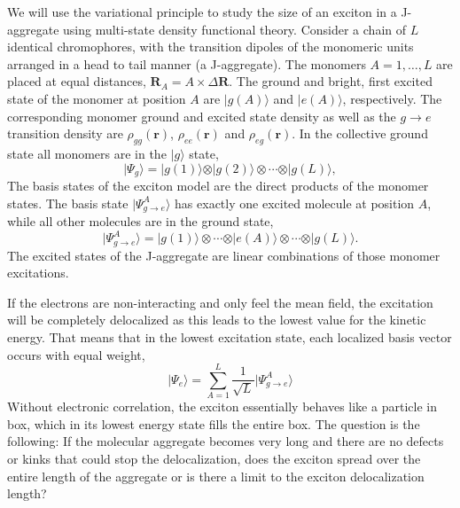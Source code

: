 \documentclass[journal=jacsat,manuscript=article]{achemso}
\renewcommand\vec[1]{\mathbf{#1}}
\begin{document}
We will use the variational principle to study the size of an exciton in a J-aggregate using multi-state density functional theory.
Consider a chain of $L$ identical chromophores, with the transition dipoles of the monomeric units arranged in a head to tail manner (a J-aggregate).
The monomers $A=1,\ldots,L$ are placed at equal distances, $\vec{R}_A = A \times \Delta \vec{R}$.
The ground and bright, first excited state of the monomer at position $A$ are $\vert g(A) \rangle$ and $\vert e(A) \rangle$, respectively.
The corresponding monomer ground and excited state density as well as the $g \to e$ transition density are $\rho_{gg}(\vec{r})$, $\rho_{ee}(\vec{r})$
and $\rho_{eg}(\vec{r})$.
In the collective ground state all monomers are in the $\vert g \rangle$ state,
\begin{equation}
 \vert \Psi_g \rangle = \vert g(1) \rangle \otimes \vert g(2) \rangle \otimes \cdots \otimes \vert g(L) \rangle,
\end{equation}
The basis states of the exciton model \cite{Kasha1965} are the direct products of the monomer states.
The basis state $\vert \Psi_{g \to e}^A \rangle$ has exactly one excited molecule at position $A$, while all other molecules are in the ground state,
\begin{equation}
 \vert \Psi_{g \to e}^A \rangle = \vert g(1) \rangle \otimes \cdots \otimes \vert e(A) \rangle \otimes \cdots \otimes \vert g(L) \rangle.
\end{equation}
The excited states of the J-aggregate are linear combinations of those monomer excitations.

If the electrons are non-interacting and only feel the mean field, the excitation will be completely delocalized
as this leads to the lowest value for the kinetic energy.  That means that in the lowest excitation state,
each localized basis vector occurs with equal weight,
\begin{equation}
 \vert \Psi_e \rangle = \sum_{A=1}^L \frac{1}{\sqrt{L}} \vert \Psi_{g \to e}^A \rangle
\end{equation}
Without electronic correlation, the exciton essentially
behaves like a particle in box, which in its lowest energy state fills the entire box.
The question is the following: If the molecular aggregate becomes very long and there are no defects or kinks that
could stop the delocalization, does the exciton spread over the entire length of the aggregate
or is there a limit to the exciton delocalization length?
\end{document}
